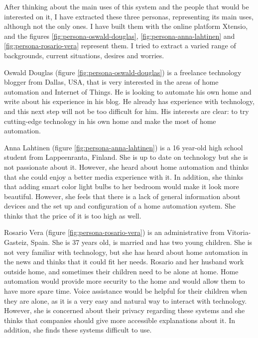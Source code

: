 After thinking about the main uses of this system and the people that would be interested on it, I have extracted these three personas,
representing its main uses, although not the only ones. I have built them with the online platform Xtensio, and the figures
\ref{fig:persona-oswald-douglas}, \ref{fig:persona-anna-lahtinen} and \ref{fig:persona-rosario-vera} represent them. I tried to extract
a varied range of backgrounds, current situations, desires and worries.

Oswald Douglas (figure \ref{fig:persona-oswald-douglas}) is a freelance technology blogger from Dallas, USA, that is very interested
in the areas of home automation and Internet of Things. He is looking to automate his own home and write about his experience in
his blog. He already has experience with technology, and this next step will not be too difficult for him. His interests are clear:
to try cutting-edge technology in his own home and make the most of home automation.

Anna Lahtinen (figure \ref{fig:persona-anna-lahtinen}) is a 16 year-old high school student from Lappeenranta, Finland. She is up
to date on technology but she is not passionate about it. However, she heard about home automation and thinks that she could enjoy
a better media experience with it. In addition, she thinks that adding smart color light bulbs to her bedroom would make it look more
beautiful. However, she feels that there is a lack of general information about devices and the set up and configuration of a home
automation system. She thinks that the price of it is too high as well.

Rosario Vera (figure \ref{fig:persona-rosario-vera}) is an administrative from Vitoria-Gasteiz, Spain. She is 37 years old, is married and
has two young children. She is not very familiar with technology, but she has heard about home automation in the news and thinks
that it could fit her needs. Rosario and her husband work outside home, and sometimes their children need to be alone at home. Home
automation would provide more security to the home and would allow them to have more spare time. Voice assistance would be helpful
for their children when they are alone, as it is a very easy and natural way to interact with technology. However, she is concerned about
their privacy regarding these systems and she thinks that companies should give more accessible explanations about it. In addition,
she finds these systems difficult to use.

